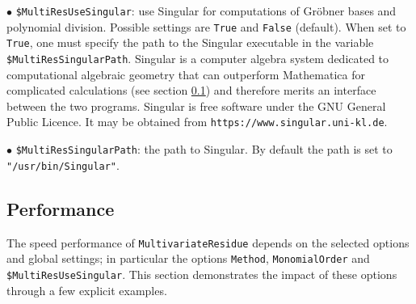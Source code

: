 \documentclass[dvipsnames,preprint,12pt,sort&compress]{elsarticle}
\newcommand{\Math}[1]
{\lstinline[style=Mathematica,breaklines=false,basicstyle=\small \ttfamily\null]~#1~}
\begin{document}
\vspace{2mm}\noindent$\bullet$
\Math{$MultiResUseSingular}: use Singular for computations of Gr{\"o}bner bases and polynomial division. Possible settings are \Math{True} and \Math{False} (default).
When set to \Math{True}, one must specify the path to the Singular executable in the variable \Math{$MultiResSingularPath}.
Singular is a computer algebra system dedicated to computational algebraic geometry that can outperform Mathematica for complicated calculations (see section \ref{sec:performance}) and therefore merits an interface between the two programs.
Singular is free software under the GNU General Public Licence. It may be obtained from \texttt{https://www.singular.uni-kl.de}.

\vspace{2mm}\noindent$\bullet$
\Math{$MultiResSingularPath}: the path to Singular. By default the path is set to \Math{"/usr/bin/Singular"}.


\subsection{Performance}
\label{sec:performance}

The speed performance of \Math{MultivariateResidue} depends on the selected options and global settings; in particular the options \Math{Method}, \Math{MonomialOrder} and \Math{$MultiResUseSingular}.
This section demonstrates the impact of these options through a few explicit examples.
\end{document}
